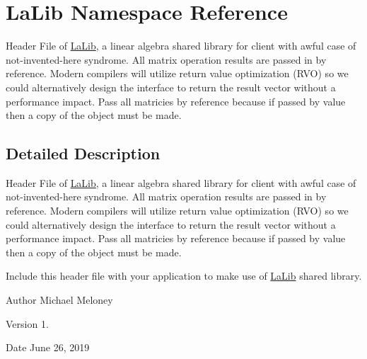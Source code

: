 \hypertarget{namespaceLaLib}{}\section{La\+Lib Namespace Reference}
\label{namespaceLaLib}


Header File of \mbox{\hyperlink{namespaceLaLib}{La\+Lib}}, a linear algebra shared library for client with awful case of not-\/invented-\/here syndrome. All matrix operation results are passed in by reference. Modern compilers will utilize return value optimization (R\+VO) so we could alternatively design the interface to return the result vector without a performance impact. Pass all matricies by reference because if passed by value then a copy of the object must be made.  




\subsection{Detailed Description}
Header File of \mbox{\hyperlink{namespaceLaLib}{La\+Lib}}, a linear algebra shared library for client with awful case of not-\/invented-\/here syndrome. All matrix operation results are passed in by reference. Modern compilers will utilize return value optimization (R\+VO) so we could alternatively design the interface to return the result vector without a performance impact. Pass all matricies by reference because if passed by value then a copy of the object must be made. 

Include this header file with your application to make use of \mbox{\hyperlink{namespaceLaLib}{La\+Lib}} shared library. \begin{DoxyAuthor}{Author}
Michael Meloney 
\end{DoxyAuthor}
\begin{DoxyVersion}{Version}
1. 
\end{DoxyVersion}
\begin{DoxyDate}{Date}
June 26, 2019 
\end{DoxyDate}
